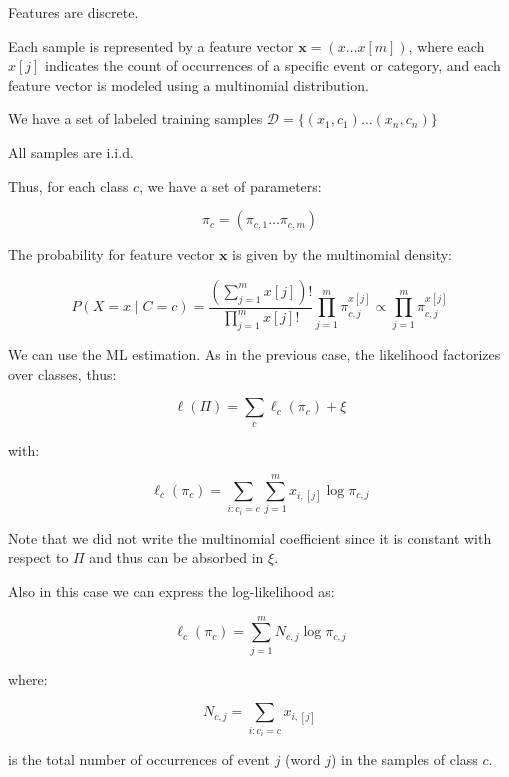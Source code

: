 Features are discrete.

Each sample is represented by a feature vector $\mathbf{x} = (x \ldots x[m])$, where each $x[j]$ indicates the count of occurrences of a specific event or category, and each feature vector is modeled using a multinomial distribution.

We have a set of labeled training samples $\mathcal{D} = \{(x_1, c_1) \ldots (x_n, c_n)\}$

All samples are i.i.d.

Thus, for each class $c$, we have a set of parameters:

\begin{equation*}
\pi_c = (\pi_{c,1} \ldots \pi_{c,m})
\end{equation*}

The probability for feature vector $\mathbf{x}$ is given by the multinomial density:

\begin{equation*}
P(X = x \mid C = c) = \frac{(\sum_{j=1}^m x[j])!}{\prod_{j=1}^m x[j]!} \prod_{j=1}^m \pi_{c,j}^{x[j]} \propto \prod_{j=1}^m \pi_{c,j}^{x[j]}
\end{equation*}

We can use the ML estimation. As in the previous case, the likelihood factorizes over classes, thus:

\begin{equation*}
\ell(\Pi) = \sum_c \ell_c(\pi_c) + \xi
\end{equation*}

with:

\begin{equation*}
\ell_c(\pi_c) = \sum_{i: c_i = c} \sum_{j=1}^m x_{i,[j]} \log \pi_{c,j}
\end{equation*}

Note that we did not write the multinomial coefficient since it is constant with respect to $\Pi$ and thus can be absorbed in $\xi$.

Also in this case we can express the log-likelihood as:

\begin{equation*}
\ell_c(\pi_c) = \sum_{j=1}^m N_{c,j} \log \pi_{c,j}
\end{equation*}

where:

\begin{equation*}
N_{c,j} = \sum_{i: c_i = c} x_{i,[j]}
\end{equation*}

is the total number of occurrences of event $j$ (word $j$) in the samples of class $c$.

